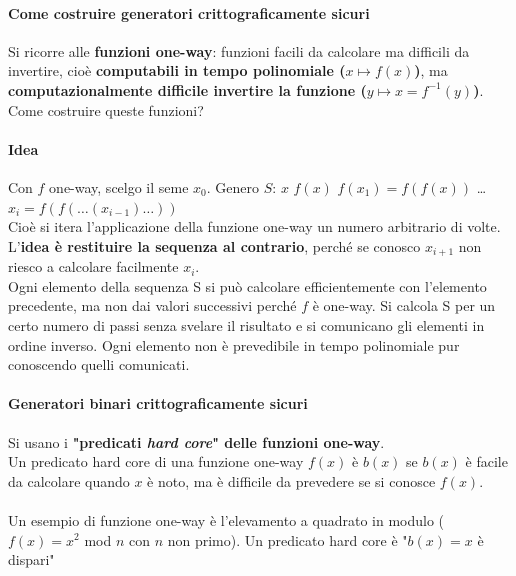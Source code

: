 \documentclass[10pt]{book}
\begin{document}
\paragraph{Come costruire generatori crittograficamente sicuri}
Si ricorre alle \textbf{funzioni one-way}: funzioni facili da calcolare ma difficili da invertire, cioè \textbf{computabili in tempo polinomiale ($x\mapsto f(x)$)}, ma \textbf{computazionalmente difficile invertire la funzione ($y\mapsto x=f^{-1}(y)$)}. Come costruire queste funzioni?
\paragraph{Idea} Con $f$ one-way, scelgo il seme $x_0$. Genero $S$: $x$ $f(x)$ $f(x_1)=f(f(x))$ \ldots $x_i = f(f(\ldots(x_{i-1})\ldots))$\\
Cioè si itera l'applicazione della funzione one-way un numero arbitrario di volte. L'\textbf{idea è restituire la sequenza al contrario}, perché se conosco $x_{i+1}$ non riesco a calcolare facilmente $x_i$.\\
Ogni elemento della sequenza S si può calcolare efficientemente con l'elemento precedente, ma non dai valori successivi perché $f$ è one-way. Si calcola S per un certo numero di passi senza svelare il risultato e si comunicano gli elementi in ordine inverso. Ogni elemento non è prevedibile in tempo polinomiale pur conoscendo quelli comunicati.
\paragraph{Generatori binari crittograficamente sicuri} Si usano i \textbf{"predicati \textit{hard core}" delle funzioni one-way}.\\
Un predicato hard core di una funzione one-way $f(x)$ è $b(x)$ se $b(x)$ è facile da calcolare quando $x$ è noto, ma è difficile da prevedere se si conosce $f(x)$.\\\\
Un esempio di funzione one-way è l'elevamento a quadrato in modulo ($f(x) = x^2$ mod $n$ con $n$ non primo). Un predicato hard core è "$b(x) = x$ è dispari"
\end{document}
